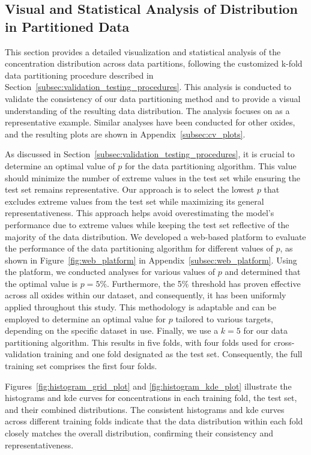 \subsection{Visual and Statistical Analysis of  Distribution in Partitioned Data}\label{sec:visual_analysis}
This section provides a detailed visualization and statistical analysis of the  concentration distribution across data partitions, following the customized k-fold data partitioning procedure described in Section~\ref{subsec:validation_testing_procedures}.
This analysis is conducted to validate the consistency of our data partitioning method and to provide a visual understanding of the resulting data distribution.
The analysis focuses on  as a representative example.
Similar analyses have been conducted for other oxides, and the resulting plots are shown in Appendix~\ref{subsec:cv_plots}.

As discussed in Section~\ref{subsec:validation_testing_procedures}, it is crucial to determine an optimal value of $p$ for the data partitioning algorithm.
This value should minimize the number of extreme values in the test set while ensuring the test set remains representative.
Our approach is to select the lowest $p$ that excludes extreme values from the test set while maximizing its general representativeness.
This approach helps avoid overestimating the model's performance due to extreme values while keeping the test set reflective of the majority of the data distribution.
We developed a web-based platform to evaluate the performance of the data partitioning algorithm for different values of $p$, as shown in Figure~\ref{fig:web_platform} in Appendix~\ref{subsec:web_platform}.
Using the platform, we conducted analyses for various values of $p$ and determined that the optimal value is $p=5\%$.
Furthermore, the 5\% threshold has proven effective across all oxides within our dataset, and consequently, it has been uniformly applied throughout this study.
This methodology is adaptable and can be employed to determine an optimal value for $p$ tailored to various targets, depending on the specific dataset in use.
Finally, we use a $k=5$ for our data partitioning algorithm.
This results in five folds, with four folds used for cross-validation training and one fold designated as the test set.
Consequently, the full training set comprises the first four folds.

Figures~\ref{fig:histogram_grid_plot} and \ref{fig:histogram_kde_plot} illustrate the histograms and \gls{kde} curves for  concentrations in each training fold, the test set, and their combined distributions.
The consistent histograms and \gls{kde} curves across different training folds indicate that the data distribution within each fold closely matches the overall distribution, confirming their consistency and representativeness.

